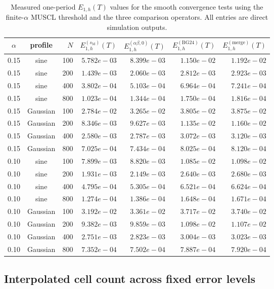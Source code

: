 \documentclass[preprint,12pt]{elsarticle}
\begin{document}
\begin{table}[ht]
\centering
\small
\begin{tabular}{ccrrrrr}
$\alpha$ & profile & $N$ &
$E_{1,h}^{(s_{\mathrm M})}(T)$ &
$E_{1,h}^{(\alpha\beta,0)}(T)$ &
$E_{1,h}^{(\mathrm{BG24})}(T)$ &
$E_{1,h}^{(\mathrm{merge})}(T)$ \\
\hline
0.15 & sine & 100 & $5.782e-03$ & $8.399e-03$ & $1.150e-02$ & $1.192e-02$ \\
0.15 & sine & 200 & $1.439e-03$ & $2.060e-03$ & $2.812e-03$ & $2.923e-03$ \\
0.15 & sine & 400 & $3.802e-04$ & $5.103e-04$ & $6.964e-04$ & $7.241e-04$ \\
0.15 & sine & 800 & $1.023e-04$ & $1.344e-04$ & $1.750e-04$ & $1.816e-04$ \\
0.15 & Gaussian & 100 & $2.784e-02$ & $3.265e-02$ & $3.805e-02$ & $3.875e-02$ \\
0.15 & Gaussian & 200 & $8.346e-03$ & $9.627e-03$ & $1.135e-02$ & $1.160e-02$ \\
0.15 & Gaussian & 400 & $2.580e-03$ & $2.787e-03$ & $3.072e-03$ & $3.120e-03$ \\
0.15 & Gaussian & 800 & $7.025e-04$ & $7.434e-04$ & $8.025e-04$ & $8.120e-04$ \\
0.10 & sine & 100 & $7.899e-03$ & $8.820e-03$ & $1.085e-02$ & $1.098e-02$ \\
0.10 & sine & 200 & $1.931e-03$ & $2.149e-03$ & $2.640e-03$ & $2.680e-03$ \\
0.10 & sine & 400 & $4.795e-04$ & $5.305e-04$ & $6.521e-04$ & $6.624e-04$ \\
0.10 & sine & 800 & $1.274e-04$ & $1.386e-04$ & $1.648e-04$ & $1.671e-04$ \\
0.10 & Gaussian & 100 & $3.192e-02$ & $3.361e-02$ & $3.717e-02$ & $3.740e-02$ \\
0.10 & Gaussian & 200 & $9.382e-03$ & $9.859e-03$ & $1.098e-02$ & $1.107e-02$ \\
0.10 & Gaussian & 400 & $2.751e-03$ & $2.823e-03$ & $3.004e-03$ & $3.023e-03$ \\
0.10 & Gaussian & 800 & $7.352e-04$ & $7.502e-04$ & $7.887e-04$ & $7.920e-04$ \\
\end{tabular}
\caption{Measured one-period $E_{1,h}(T)$ values for the smooth convergence
tests using the finite-$\alpha$ MUSCL threshold and the three comparison operators.
All entries are direct simulation outputs.}
\label{tab:raw-convergence}
\end{table}
\subsection{Interpolated cell count across fixed error levels}
\end{document}
